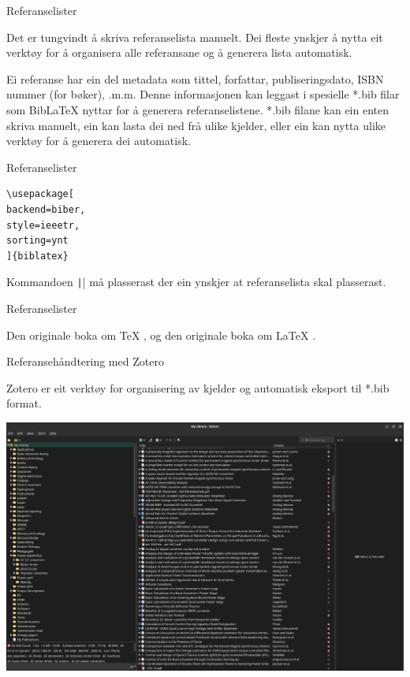\begin{frame}[containsverbatim]{Referanselister}
	
	Det er tungvindt å skriva referanselista manuelt. Dei fleste ynskjer å nytta eit verktøy for å organisera alle referansane og å generera lista automatisk.
	
	Ei referanse har ein del metadata som tittel, forfattar, publiseringsdato, ISBN nummer (for bøker), .m.m. Denne informasjonen kan leggast i spesielle *.bib filar som BibLaTeX nyttar for å generera referanselistene. *.bib filane kan ein enten skriva manuelt, ein kan lasta dei ned frå ulike kjelder, eller ein kan nytta ulike verktøy for å generera dei automatisk.	
	

	
\end{frame}


\begin{frame}[containsverbatim]{Referanselister}
	
	\begin{verbatim}
\usepackage[
backend=biber,
style=ieeetr,
sorting=ynt
]{biblatex}

	\end{verbatim}

Kommandoen \texttt|\printbibliography| må plasserast der ein ynskjer at referanselista skal plasserast.

\end{frame}


\begin{frame}[containsverbatim]{Referanselister}

Den originale boka om \TeX{} \cite{knuth1986texbook}, og den originale boka om \LaTeX{} \cite{lamport1994latex}.
	
\printbibliography

\end{frame}


\begin{frame}{Referansehåndtering med Zotero}

  Zotero er eit verktøy for organisering av kjelder og automatisk eksport til *.bib format.

  \includegraphics[width=\textwidth]{img/zotero_screenshot.png}
	
\end{frame}

